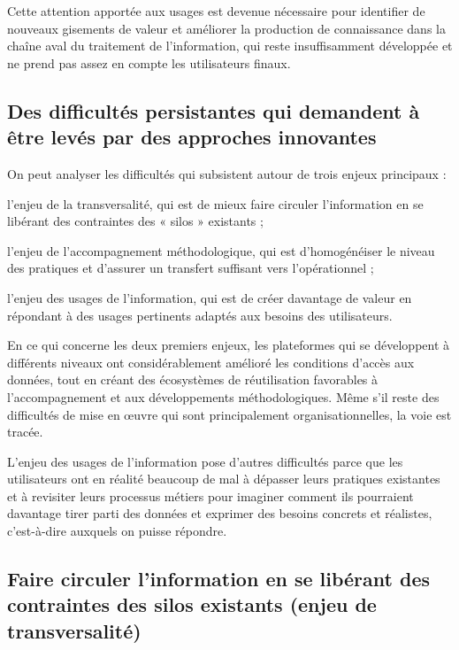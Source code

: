 \stopitemize

Cette attention apportée aux usages est devenue nécessaire pour identifier de
nouveaux gisements de valeur et améliorer la production de connaissance
dans la chaîne aval du traitement de l'information, qui reste
insuffisamment développée et ne prend pas assez en compte les utilisateurs
finaux.


\subsection[constats:difficultes]
{Des difficultés persistantes qui demandent à être levés par des approches
innovantes}

On peut analyser les difficultés qui subsistent
autour de trois enjeux principaux :

\startitemize

\item l'enjeu de la transversalité, qui est de mieux faire circuler l'information en
se libérant des contraintes des « silos » existants ;

\item l'enjeu de l'accompagnement méthodologique, qui est d'homogénéiser le niveau
des pratiques et d'assurer un transfert suffisant vers l'opérationnel ;

\item l'enjeu des usages de l'information, qui est de créer davantage de valeur en
répondant à des usages pertinents adaptés aux besoins des utilisateurs.

\stopitemize

En ce qui concerne les deux premiers enjeux, les plateformes qui se
développent à différents niveaux ont considérablement amélioré les conditions
d'accès aux données, tout en créant des écosystèmes de réutilisation
favorables à l'accompagnement et aux développements méthodologiques.
Même s'il reste des difficultés de mise en œuvre qui sont principalement
organisationnelles, la voie est tracée.

L'enjeu des usages de l'information pose d'autres difficultés parce que les
utilisateurs ont en réalité beaucoup de mal à dépasser leurs pratiques
existantes et à revisiter leurs processus métiers pour imaginer comment ils
pourraient davantage tirer parti des données
et exprimer des besoins concrets et réalistes,
c'est-à-dire auxquels on puisse répondre.

\subsection[constats:circulations]
{Faire circuler l'information en se libérant des contraintes des silos
existants (enjeu de transversalité)}


